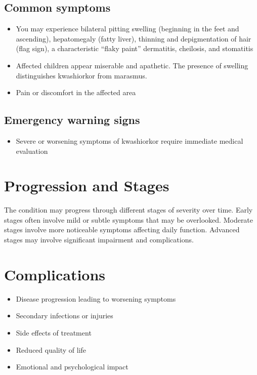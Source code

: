 \subsection{Common symptoms}
\begin{itemize}[noitemsep]
  \item You may experience bilateral pitting swelling (beginning in the feet and ascending), hepatomegaly (fatty liver), thinning and depigmentation of hair (flag sign), a characteristic ``flaky paint'' dermatitis, cheilosis, and stomatitis
  \item Affected children appear miserable and apathetic. The presence of swelling distinguishes kwashiorkor from marasmus.
  \item Pain or discomfort in the affected area
  \end{itemize}

\subsection{Emergency warning signs}
\begin{itemize}[noitemsep]
  \item Severe or worsening symptoms of kwashiorkor require immediate medical evaluation
\end{itemize}
\section{Progression and Stages}
The condition may progress through different stages of severity over time. Early stages often involve mild or subtle symptoms that may be overlooked. Moderate stages involve more noticeable symptoms affecting daily function. Advanced stages may involve significant impairment and complications.
\section{Complications}
\begin{itemize}[noitemsep]
  \item Disease progression leading to worsening symptoms
  \item Secondary infections or injuries
  \item Side effects of treatment
  \item Reduced quality of life
  \item Emotional and psychological impact
\end{itemize}
